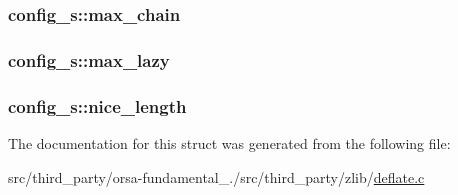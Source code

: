 \subsubsection[{max\+\_\+chain}]{ config\+\_\+s\+::max\+\_\+chain}\label{structconfig__s_ac0ef64600cf4487e3754a21934ffdb89}
\hypertarget{structconfig__s_afecf50eeeb2afca11ab28d344280231b}{}
\subsubsection[{max\+\_\+lazy}]{ config\+\_\+s\+::max\+\_\+lazy}\label{structconfig__s_afecf50eeeb2afca11ab28d344280231b}
\hypertarget{structconfig__s_af2a1e023e10d6e0c9ff64f8c0c4c9894}{}
\subsubsection[{nice\+\_\+length}]{ config\+\_\+s\+::nice\+\_\+length}\label{structconfig__s_af2a1e023e10d6e0c9ff64f8c0c4c9894}


The documentation for this struct was generated from the following file\+:\begin{DoxyCompactItemize}
\item 
src/third\+\_\+party/orsa-\/fundamental\+\_./src/third\+\_\+party/zlib/\hyperlink{deflate_8c}{deflate.\+c}\end{DoxyCompactItemize}
